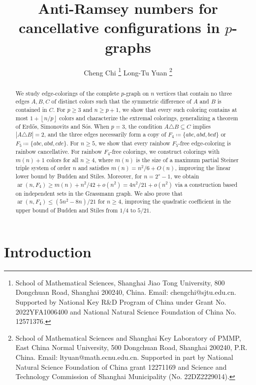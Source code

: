 \documentclass[10pt,a4paper]{article}
\theoremstyle{definition}
\newcommand{\floor}[1]{\left\lfloor #1 \right\rfloor}
\DeclareMathOperator{\ar}{ar}
\begin{document}
\title{Anti-Ramsey numbers for cancellative configurations in $p$-graphs}

\author{
    Cheng Chi
    \thanks{School of Mathematical Sciences, Shanghai Jiao Tong University, 800 Dongchuan Road, Shanghai 200240, China.
        Email: chengchi@sjtu.edu.cn.
        Supported by National Key R\&D Program of China under Grant No. 2022YFA1006400 and National Natural Science Foundation of China No. 12571376.
    }\qquad
    Long-Tu Yuan
    \thanks{School of Mathematical Sciences and Shanghai Key Laboratory of PMMP, East China Normal University, 500 Dongchuan Road, Shanghai 200240, P.R.  China.
        Email: ltyuan@math.ecnu.edu.cn. Supported in part by National Natural Science Foundation of China grant 12271169 and Science and Technology Commission
        of Shanghai Municipality (No. 22DZ2229014).
    }
}
\date{}
\maketitle


\begin{abstract}
    We study edge-colorings of the complete $p$-graph on $n$ vertices that contain no three edges $A,B,C$ of distinct colors such that the symmetric difference of $A$ and $B$ is contained in $C$.
    For $p\ge3$ and $n\ge p+1$, we show that every such coloring contains at most $1+\floor{n/p}$ colors and characterize the extremal colorings, generalizing a theorem of Erd\H{o}s, Simonovits and S\'os. %
    When $p=3$, the condition $A\triangle B\subseteq C$ implies $|A\triangle B|=2$, and the three edges necessarily form a copy of $F_4\coloneqq\{abc,abd,bcd\}$ or $F_5\coloneqq\{abc,abd,cde\}$.
    For $n\ge5$, we show that every rainbow $F_5$-free edge-coloring is rainbow cancellative.
    For rainbow $F_4$-free colorings, we construct colorings with $m(n)+1$ colors for all $n\ge4$, where $m(n)$ is the size of a maximum partial Steiner triple system of order $n$ and satisfies $m(n)=n^2/6+O(n)$, improving the linear lower bound by Budden and Stiles. %
    Moreover, for $n=2^s-1$, we obtain $\ar(n,F_4)\ge m(n)+n^2/42+o(n^2)=4n^2/21+o(n^2)$ via a construction based on independent sets in the Grassmann graph.
    We also prove that $\ar(n,F_4)\le (5n^2-8n)/21$ for $n\ge4$,     improving the quadratic coefficient in the upper bound of Budden and Stiles from $1/4$ to $5/21$.
\end{abstract}
\section{Introduction}\label{subsec:intro}
\end{document}

